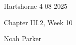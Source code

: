 \documentclass[12pt]{amsart}
\begin{document}
{Hartshorne} \hfill {4-08-2025}

\bigskip\bigskip

\begin{center}

{\sc Chapter III.2, Week 10}

\end{center}

\begin{center}

  {Noah Parker} %
    
\end{center}

\bigskip\bigskip

% 
\end{document}
